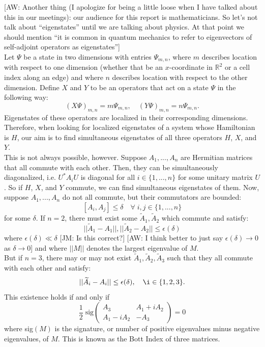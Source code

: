 \documentclass[a4paper]{article}
\newcommand{\aw}[1]{{\color{blue} [AW: #1]}}
\newcommand{\jm}[1]{{\color{red} [JM: #1]}}
\begin{document}
\aw{Another thing (I apologize for being a little loose when I have talked about this in our meetings): our audience for this report is mathematicians. So let's not talk about ``eigenstates'' until we are talking about physics. At that point we should mention ``it is common in quantum mechanics to refer to eigenvectors of self-adjoint operators as eigenstates''} \\

Let $\Psi$ be a state in two dimensions with entries $\Psi_{m,n}$, where $m$ describes location with respect to one dimension (whether that be an $x$-coordinate in $\mathbb{R}^2$ or a cell index along an edge) and where $n$ describes location with respect to the other dimension.
Define $X$ and $Y$ to be an operators that act on a state $\Psi$ in the following way:
$$(X \Psi)_{m,n} = m\Psi_{m,n}, \quad (Y \Psi)_{m,n} = n\Psi_{m,n}.$$
Eigenstates of these operators are localized in their corresponding dimensions.
Therefore, when looking for localized eigenstates of a system whose Hamiltonian is $H$, our aim is to find simultaneous eigenstates of all three operators $H$, $X$, and $Y$.\\
This is not always possible, however.
Suppose $A_1,...,A_n$ are Hermitian matrices that all commute with each other.
Then, they can be simultaneously diagonalized, i.e. $U^* A_i U$ is diagonal for all $i \in \{1,...,n\}$ for some unitary matrix $U$.
So if $H$, $X$, and $Y$ commute, we can find simultaneous eigenstates of them.
Now, suppose $A_1,...,A_n$ do not all commute, but their commutators are bounded:
$$[A_i,A_j] \leq \delta \quad \forall\; i,j \in \{1,...,n\}$$
for some $\delta$.
If $n = 2$, there must exist some $\widetilde{A}_1, \widetilde{A}_2$ which commute and satisfy:
$$||\widetilde{A}_1 - A_1||, ||\widetilde{A}_2 - A_2|| \leq \epsilon(\delta)$$
where $\epsilon(\delta) \ll \delta$ \jm{Is this correct?} \aw{I think better to just say $\epsilon(\delta) \rightarrow 0$ as $\delta \rightarrow 0$} and where $||M||$ denotes the largest eigenvalue of $M$.\\
But if $n = 3$, there may or may not exist $\widetilde{A}_1, \widetilde{A}_2, \widetilde{A}_3$ such that they all commute with each other and satisfy:
$$||\widetilde{A}_i - A_i|| \leq \epsilon(\delta), \quad \i \in \{1,2,3\}.$$
This existence holds if and only if
$$\frac{1}{2}\; \text{sig} \begin{pmatrix}
A_3 & A_1 + iA_2\\
A_1 - iA_2 & - A_3
\end{pmatrix} = 0$$
where sig$(M)$ is the signature, or number of positive eigenvalues minus negative eigenvalues, of $M$. This is known as the Bott Index of three matrices.
\end{document}
